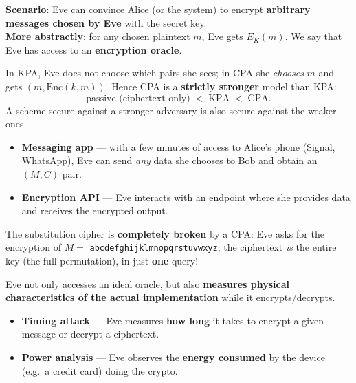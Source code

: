 \begin{defnbox}[title=Chosen Plaintext Attack (CPA)]
\textbf{Scenario}: Eve can convince Alice (or the system) to encrypt \textbf{arbitrary
messages chosen by Eve} with the secret key. \\
\textbf{More abstractly}: for any chosen plaintext $m$, Eve gets $E_K(m)$. We say that
Eve has access to an \textbf{encryption oracle}.
\end{defnbox}

\begin{rembox}[title=KPA vs.\ CPA]
In KPA, Eve does not choose which pairs she sees; in CPA she \emph{chooses} $m$ and gets
$(m, \mathrm{Enc}(k, m))$. Hence CPA is a \textbf{strictly stronger} model than KPA:
\[
  \text{passive (ciphertext only)} \;<\; \text{KPA} \;<\; \text{CPA}.
\]
A scheme secure against a stronger adversary is also secure against the weaker ones.
\end{rembox}

\begin{propbox}[title=Why is CPA a realistic model?]
\begin{itemize}
  \item \textbf{Messaging app} --- with a few minutes of access to Alice's phone
        (Signal, WhatsApp), Eve can send \emph{any} data she chooses to Bob and obtain an
        $(M, C)$ pair.
  \item \textbf{Encryption API} --- Eve interacts with an endpoint where she provides
        data and receives the encrypted output.
\end{itemize}
\end{propbox}

\begin{exbox}[title=CPA and the substitution cipher]
The substitution cipher is \textbf{completely broken} by a CPA: Eve asks for the
encryption of $M = $ \texttt{abcdefghijklmnopqrstuvwxyz}; the ciphertext \emph{is} the
entire key (the full permutation), in just \textbf{one} query!
\end{exbox}

\begin{defnbox}[title=Side-channel attacks]
Eve not only accesses an ideal oracle, but also \textbf{measures physical
characteristics of the actual implementation} while it encrypts/decrypts.
\begin{itemize}
  \item \textbf{Timing attack} --- Eve measures \textbf{how long} it takes to encrypt a
        given message or decrypt a ciphertext.
  \item \textbf{Power analysis} --- Eve observes the \textbf{energy consumed} by the
        device (e.g.\ a credit card) doing the crypto.
\end{itemize}
\end{defnbox}

